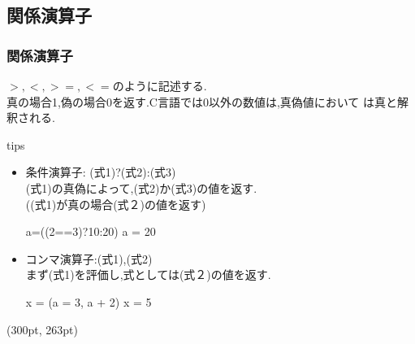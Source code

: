 \documentclass[dvipdfmx]{beamer}
\begin{document}
\subsection{関係演算子}
\begin{frame}[t, fragile]
    \frametitle{関係演算子}
    $>,<,>=,<=$のように記述する.\\
    真の場合1,偽の場合0を返す.C言語では0以外の数値は,真偽値において
    は真と解釈される.
    \begin{itembox}[l]{tips}
        \begin{itemize}
            \item 条件演算子: (式1)?(式2):(式3)\\
                (式1)の真偽によって,(式2)か(式3)の値を返す.\\
                ((式1)が真の場合(式２)の値を返す)
                \begin{block}{a=((2==3)?10:20)}
                    a = 20
                \end{block}
            \item コンマ演算子:(式1),(式2)\\
                まず(式1)を評価し,式としては(式２)の値を返す.
                \begin{block}{x = (a = 3, a + 2)}
                    x = 5
                \end{block}
        \end{itemize}
    \end{itembox}
    \begin{textblock*}{0.3\linewidth}(300pt, 263pt)
    \space
    \end{textblock*}
\end{frame}
\end{document}
